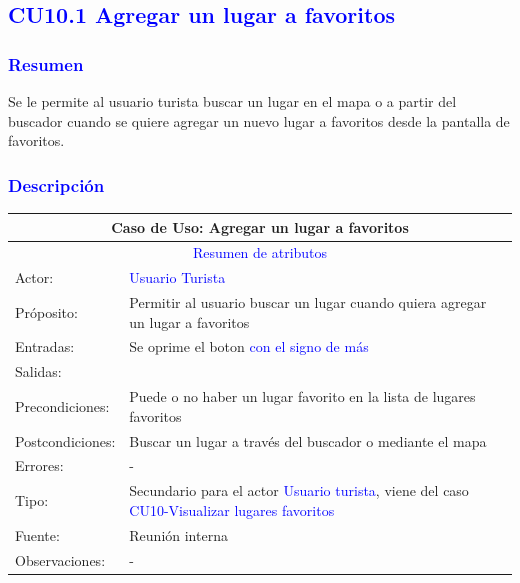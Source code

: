 

\pagebreak
\subsection{\textcolor{blue}{CU10.1 Agregar un lugar a favoritos}}
\subsubsection{\textcolor{blue}{Resumen}}
 Se le permite al usuario turista buscar un lugar en el mapa o a partir del buscador cuando se quiere agregar un nuevo lugar a favoritos desde la pantalla de favoritos.
\subsubsection{\textcolor{blue}{Descripción}}
\begin{tabularx}{16cm}{||l|X||}
	\hline
	\multicolumn{2}{||c||}{Caso de Uso: Agregar un lugar a favoritos} \\
	\hline
	\multicolumn{2}{||c||}{\textcolor{blue}{Resumen de atributos}} \\
	\hline
	{Actor:} & {\textcolor{blue}{Usuario Turista}} \\
	\hline
	{Próposito:} & {Permitir al usuario buscar un lugar cuando quiera agregar un lugar a favoritos} \\
	\hline
	{Entradas:} & {Se oprime el boton \textcolor{blue}{con el signo de más}}\\
	\hline
	{Salidas:} & {}\\
	\hline
	{Precondiciones:} & {Puede o no haber un lugar favorito en la lista de lugares favoritos}\\ 
	\hline
	{Postcondiciones:} & {Buscar un lugar a través del buscador o mediante el mapa}\\
	\hline
	{Errores:} & {-} \\
	\hline
	{Tipo:} & {Secundario para el actor \textcolor{blue}{Usuario turista}, viene del caso \textcolor{blue}{CU10-Visualizar lugares favoritos}}\\
	\hline
	{Fuente:} & {Reunión interna} \\
	\hline
	{Observaciones:} & {-} \\
	\hline
\end{tabularx}


